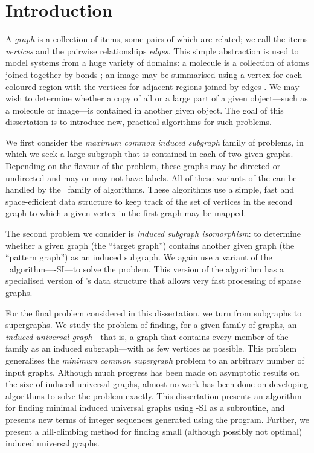 \chapter{Introduction}
\label{c:intro}

\newcommand{\ChapterRef}[1] {\Cref{#1}: \nameref{#1}}

A \emph{graph} is a collection of items, some pairs of which are related; we
call the items \emph{vertices} and the pairwise relationships \emph{edges}.
This simple abstraction
is used to model systems from a huge variety of domains: a molecule is a
collection of atoms joined together by bonds \citep{sussenguth1965graph}; an
image may be summarised using a vertex for each coloured region with the
vertices for adjacent regions joined by edges
\citep{DBLP:conf/icip/OlatunbosunDE96}.  We may wish to determine whether a
copy of all
or a large part of a given object---such as a molecule or image---is contained
in another given object.  The goal of this dissertation is to introduce new,
practical algorithms for such problems.

We first consider the \emph{maximum common induced subgraph} family of
problems, in which we seek a large subgraph that is contained in each of two
given graphs.  Depending on the flavour of the problem, these graphs may be
directed or undirected and may or may not have labels.  All of these variants
of the can be handled by the \McSplit\ family of algorithms.  These algorithms
use a simple, fast and space-efficient data structure to keep track of the set
of vertices in the second graph to which a given vertex in the first graph may
be mapped.

The second problem we consider is \emph{induced subgraph isomorphism}: to
determine whether a given graph (the ``target graph'') contains another given
graph (the ``pattern graph'') as an induced subgraph.  We again use a variant
of the \McSplit\ algorithm---\McSplit-SI---to solve the problem. This version
of the algorithm has a specialised version of \McSplit's data structure that
allows very fast processing of sparse graphs.

For the final problem considered in this dissertation, we turn from subgraphs
to supergraphs.  We study the problem of finding, for a given family of graphs,
an \textit{induced universal graph}---that is, a graph that contains every
member of the family as an induced subgraph---with as few vertices as
possible.  This problem generalises the \textit{minimum common supergraph}
problem to an arbitrary number of input graphs.  Although much progress has
been made on asymptotic results on the size of induced universal graphs, almost no
work has been done on developing algorithms to solve the problem exactly.  This
dissertation presents an algorithm for finding minimal induced universal graphs
using \McSplit-SI as a subroutine, and presents new terms of integer sequences
generated using the program.  Further, we present a hill-climbing method for
finding small (although possibly not optimal) induced universal graphs.

